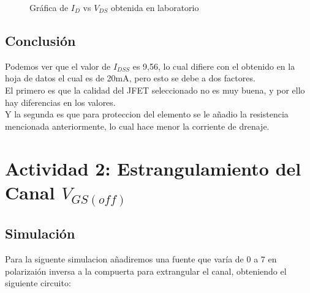 \vspace{0.1cm}

\begin{figure}[ht]
    \centering
    \caption{Gráfica de $I_D$ vs $V_{DS}$ obtenida en laboratorio}
\end{figure}


\subsection{Conclusión}

Podemos ver que el valor de $I_{DSS}$ es 9,56, lo cual difiere con el obtenido en la hoja de datos el cual es de 20mA, pero esto se debe a dos factores.\\
El primero es que la calidad del JFET seleccionado no es muy buena, y por ello hay diferencias en los valores.\\
Y la segunda es que para proteccion del elemento se le añadio la resistencia mencionada anteriormente, lo cual hace menor la corriente de drenaje.

\section{Actividad 2: Estrangulamiento del Canal $V_{GS(off)}$}

\subsection{Simulación}

Para la siguente simulacion añadiremos una fuente que varía de 0 a 7 en polarizaión inversa a la compuerta para extrangular el canal, obteniendo el siguiente circuito:

